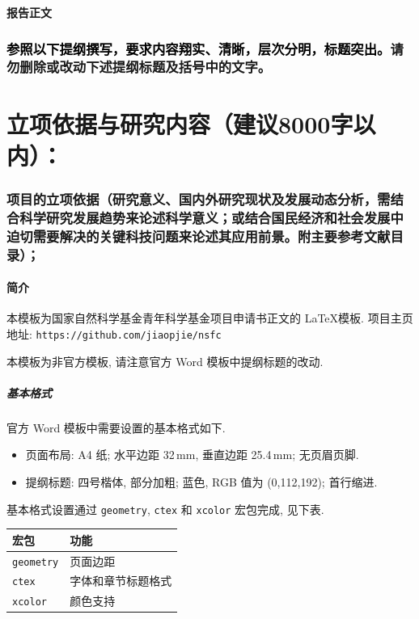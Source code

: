 \documentclass{article}
\let\kaishu\relax\newCJKfontfamily\kaishu{KaiTi}[AutoFakeBold=2.85] %
\begin{document}
\begin{center}
  \kaishu\bfseries 报告正文
\end{center}

\section*{\textcolor{black}{参照以下提纲撰写，要求内容翔实、清晰，层次分明，标题突出。}\textbf{请勿删除或改动下述提纲标题及括号中的文字。}}

\part[立项依据与研究内容]
{\textbf{立项依据与研究内容}（建议8000字以内）：}

\section[项目的立项依据]
{\textbf{项目的立项依据}（研究意义、国内外研究现状及发展动态分析，需结合科学研究发展趋势来论述科学意义；或结合国民经济和社会发展中迫切需要解决的关键科技问题来论述其应用前景。附主要参考文献目录）；}

\subsection{简介}

本模板为国家自然科学基金青年科学基金项目申请书正文的 \LaTeX 模板.
项目主页地址: \texttt{https://github.com/jiaopjie/nsfc}

本模板为非官方模板, 请注意官方 Word 模板中提纲标题的改动.

\subsubsection{基本格式}

官方 Word 模板中需要设置的基本格式如下.
\begin{itemize}
  \item \textsf{页面布局:}
    A4 纸; 水平边距 32\,mm, 垂直边距 25.4\,mm; 无页眉页脚.
  \item \textsf{提纲标题:}
    四号楷体, 部分加粗; 蓝色, RGB 值为 (0,112,192); 首行缩进.
\end{itemize}

基本格式设置通过 \verb'geometry', \verb'ctex' 和 \verb'xcolor' 宏包完成, 见下表.
\smallskip
\begin{center}
  \begin{tabular}{ll} \toprule
    \sffamily 宏包  & \sffamily 功能 \\ \midrule
    \verb'geometry' & 页面边距 \\
    \verb'ctex'     & 字体和章节标题格式 \\
    \verb'xcolor'   & 颜色支持 \\ \bottomrule
  \end{tabular} 
\end{center}
\smallskip
\end{document}
